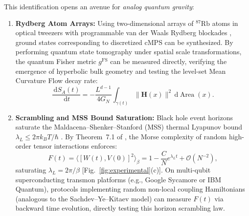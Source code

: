 \documentclass[aps,prl,reprint,twocolumn,superscriptaddress,nofootinbib,floatfix]{revtex4-2}
\newcommand{\dif}{\,\mathrm{d}}
\providecommand{\Area}{\operatorname{Area}}
\begin{document}
This identification opens an avenue for \emph{analog quantum gravity}:
\begin{enumerate}[label=(\alph*)]
    \item \textbf{Rydberg Atom Arrays:} Using two-dimensional arrays of $^{87}\mathrm{Rb}$ atoms in optical tweezers with programmable van der Waals Rydberg blockades \cite{ebadi2021quantum}, ground states corresponding to discretized cMPS can be synthesized. By performing quantum state tomography under spatial scale transformations, the quantum Fisher metric $g^{\mathrm{FS}}$ can be measured directly, verifying the emergence of hyperbolic bulk geometry and testing the level-set Mean Curvature Flow decay rate:
    \begin{equation}
        \frac{\dif S_A(t)}{\dif t} = -\frac{L^{d-1}}{4 G_N} \int_{\gamma(t)} \|\mathbf{H}(x)\|^2 \dif \Area(x).
    \end{equation}
    \item \textbf{Scrambling and MSS Bound Saturation:} Black hole event horizons saturate the Maldacena--Shenker--Stanford (MSS) thermal Lyapunov bound $\lambda_L \le 2\pi k_B T / \hbar$ \cite{maldacena2016bound}. By Theorem~7.1 of \cite{silvafilho2026grand}, the Morse complexity of random high-order tensor interactions enforces:
    \begin{equation}
        F(t) = \langle [W(t), V(0)]^2 \rangle_\beta = 1 - \frac{C}{N} e^{\lambda_L t} + \mathcal{O}(N^{-2}),
    \end{equation}
    saturating $\lambda_L = 2\pi / \beta$ [Fig.~\ref{fig:experimental}(c)]. On multi-qubit superconducting transmon platforms (e.g., Google Sycamore or IBM Quantum), protocols implementing random non-local coupling Hamiltonians (analogous to the Sachdev--Ye--Kitaev model) can measure $F(t)$ via backward time evolution, directly testing this horizon scrambling law.
\end{enumerate}
\end{document}
